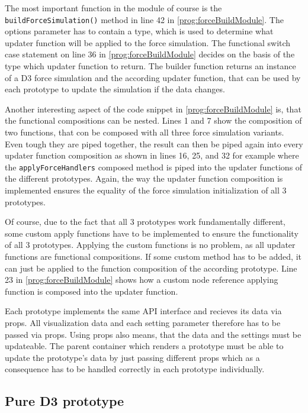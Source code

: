 The most important function in the module of course is the \texttt{buildForceSimulation()} method in line 42 in \ref{prog:forceBuildModule}. The options parameter has to contain a type, which is used to determine what updater function will be applied to the force simulation. The functional switch case statement on line 36 in \ref{prog:forceBuildModule} decides on the basis of the type which updater function to return. The builder function returns an instance of a D3 force simulation and the according updater function, that can be used by each prototype to update the simulation if the data changes.

Another interesting aspect of the code snippet in \ref{prog:forceBuildModule} is, that the functional compositions can be nested. Lines 1 and 7 show the composition of two functions, that con be composed with all three force simulation variants. Even tough they are piped together, the result can then be piped again into every updater function composition as shown in lines 16, 25, and 32 for example where the \texttt{applyForceHandlers} composed method is piped into the updater functions of the different prototypes. Again, the way the updater function composition is implemented ensures the equality of the force simulation initialization of all 3 prototypes.

Of course, due to the fact that all 3 prototypes work fundamentally different, some custom apply functions have to be implemented to ensure the functionality of all 3 prototypes. Applying the custom functions is no problem, as all updater functions are functional compositions. If some custom method has to be added, it can just be applied to the function composition of the according prototype. Line 23 in \ref{prog:forceBuildModule} shows how a custom node reference applying function is composed into the updater function.

Each prototype implements the same API interface and recieves its data via props. All visualization data and each setting parameter therefore has to be passed via props. Using props also means, that the data and the settings must be updateable. The parent container which renders a prototype must be able to update the prototype's data by just passing different props which as a consequence has to be handled correctly in each prototype individually.

\subsection{Pure D3 prototype}

